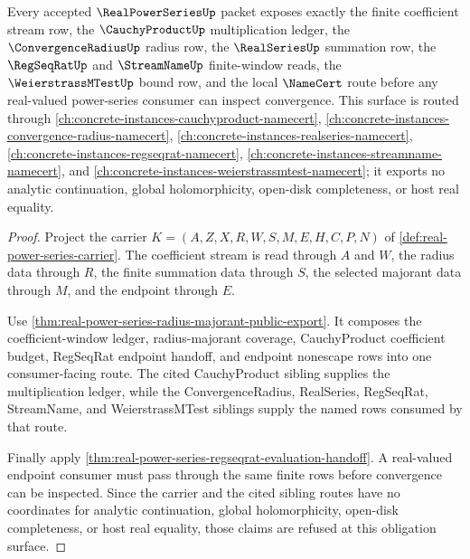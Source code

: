 \begin{theorem}
\label{thm:real-power-series-root-unblock-obligation-surface}
Every accepted $\RealPowerSeriesUp$ packet exposes exactly the finite coefficient stream row, the $\CauchyProductUp$ multiplication ledger, the $\ConvergenceRadiusUp$ radius row, the $\RealSeriesUp$ summation row, the $\RegSeqRatUp$ and $\StreamNameUp$ finite-window reads, the $\WeierstrassMTestUp$ bound row, and the local $\NameCert$ route before any real-valued power-series consumer can inspect convergence. This surface is routed through \autoref{ch:concrete-instances-cauchyproduct-namecert}, \autoref{ch:concrete-instances-convergence-radius-namecert}, \autoref{ch:concrete-instances-realseries-namecert}, \autoref{ch:concrete-instances-regseqrat-namecert}, \autoref{ch:concrete-instances-streamname-namecert}, and \autoref{ch:concrete-instances-weierstrassmtest-namecert}; it exports no analytic continuation, global holomorphicity, open-disk completeness, or host real equality.
\end{theorem}
\begin{proof}
Project the carrier $K=(A,Z,X,R,W,S,M,E,H,C,P,N)$ of \autoref{def:real-power-series-carrier}. The coefficient stream is read through $A$ and $W$, the radius data through $R$, the finite summation data through $S$, the selected majorant data through $M$, and the endpoint through $E$.

Use \autoref{thm:real-power-series-radius-majorant-public-export}. It composes the coefficient-window ledger, radius-majorant coverage, CauchyProduct coefficient budget, RegSeqRat endpoint handoff, and endpoint nonescape rows into one consumer-facing route. The cited CauchyProduct sibling supplies the multiplication ledger, while the ConvergenceRadius, RealSeries, RegSeqRat, StreamName, and WeierstrassMTest siblings supply the named rows consumed by that route.

Finally apply \autoref{thm:real-power-series-regseqrat-evaluation-handoff}. A real-valued endpoint consumer must pass through the same finite rows before convergence can be inspected. Since the carrier and the cited sibling routes have no coordinates for analytic continuation, global holomorphicity, open-disk completeness, or host real equality, those claims are refused at this obligation surface.
\end{proof}

